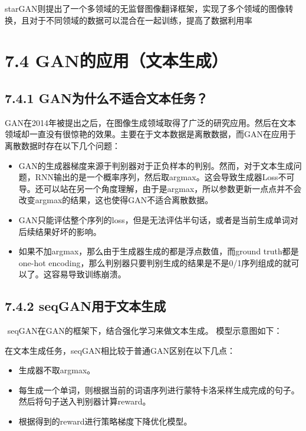 starGAN则提出了一个多领域的无监督图像翻译框架，实现了多个领域的图像转换，且对于不同领域的数据可以混合在一起训练，提高了数据利用率

\section{7.4
GAN的应用（文本生成）}\label{ganux7684ux5e94ux7528ux6587ux672cux751fux6210}

\subsection{7.4.1
GAN为什么不适合文本任务？}\label{ganux4e3aux4ec0ux4e48ux4e0dux9002ux5408ux6587ux672cux4efbux52a1}

​
GAN在2014年被提出之后，在图像生成领域取得了广泛的研究应用。然后在文本领域却一直没有很惊艳的效果。主要在于文本数据是离散数据，而GAN在应用于离散数据时存在以下几个问题：

\begin{itemize}
\item
  GAN的生成器梯度来源于判别器对于正负样本的判别。然而，对于文本生成问题，RNN输出的是一个概率序列，然后取argmax。这会导致生成器Loss不可导。还可以站在另一个角度理解，由于是argmax，所以参数更新一点点并不会改变argmax的结果，这也使得GAN不适合离散数据。
\item
  GAN只能评估整个序列的loss，但是无法评估半句话，或者是当前生成单词对后续结果好坏的影响。
\item
  如果不加argmax，那么由于生成器生成的都是浮点数值，而ground
  truth都是one-hot
  encoding，那么判别器只要判别生成的结果是不是0/1序列组成的就可以了。这容易导致训练崩溃。
\end{itemize}

\subsection{7.4.2
seqGAN用于文本生成}\label{seqganux7528ux4e8eux6587ux672cux751fux6210}

​ seqGAN在GAN的框架下，结合强化学习来做文本生成。 模型示意图如下：

在文本生成任务，seqGAN相比较于普通GAN区别在以下几点：

\begin{itemize}
\item
  生成器不取argmax。
\item
  每生成一个单词，则根据当前的词语序列进行蒙特卡洛采样生成完成的句子。然后将句子送入判别器计算reward。
\item
  根据得到的reward进行策略梯度下降优化模型。
\end{itemize}

